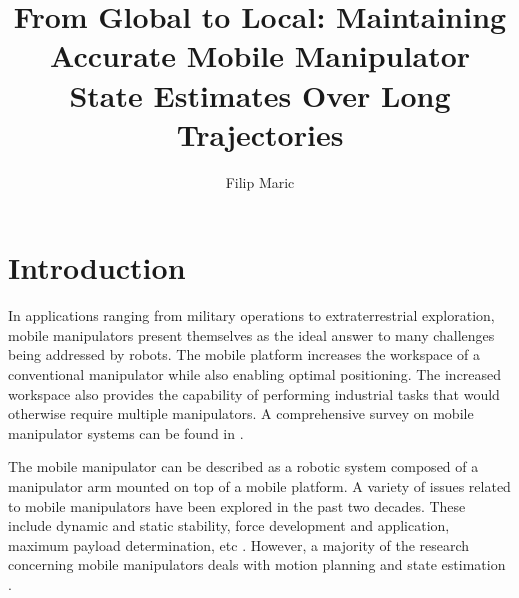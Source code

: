 \documentclass[times, utf8, diplomski, english]{fer}
\begin{document}

\title{From Global to Local: Maintaining Accurate Mobile Manipulator State Estimates Over Long Trajectories}

\author{Filip Maric}

\maketitle

\izvornik


\tableofcontents

\chapter{Introduction}
In applications ranging from military operations to extraterrestrial exploration, mobile manipulators present themselves as the ideal answer to many challenges being addressed by robots.
The mobile platform increases the workspace of a conventional manipulator while also enabling optimal positioning.
The increased workspace also provides the capability of performing industrial tasks that would otherwise require multiple manipulators.
A comprehensive survey on mobile manipulator systems can be found in \citep{bloch2003nonholonomic}.

The mobile manipulator can be described as a robotic system composed of a manipulator arm mounted on top of a mobile platform.
A variety of issues related to mobile manipulators have been explored in the past two decades. 
These include dynamic and static stability, force development and application, maximum payload determination, etc \citep{papadopoulos1999framework,korayem2004analysis}.
However, a majority of the research concerning mobile manipulators deals with motion planning and state estimation \citep{yamamoto1992coordinating,korayem2012mathematical}.
 
\end{document}
